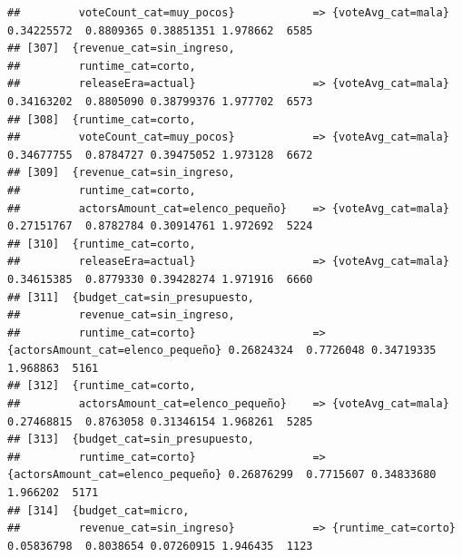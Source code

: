 \documentclass[
]{article}
\begin{document}
\begin{verbatim}
##         voteCount_cat=muy_pocos}            => {voteAvg_cat=mala}                0.34225572  0.8809365 0.38851351 1.978662  6585
## [307]  {revenue_cat=sin_ingreso,                                                                                                
##         runtime_cat=corto,                                                                                                      
##         releaseEra=actual}                  => {voteAvg_cat=mala}                0.34163202  0.8805090 0.38799376 1.977702  6573
## [308]  {runtime_cat=corto,                                                                                                      
##         voteCount_cat=muy_pocos}            => {voteAvg_cat=mala}                0.34677755  0.8784727 0.39475052 1.973128  6672
## [309]  {revenue_cat=sin_ingreso,                                                                                                
##         runtime_cat=corto,                                                                                                      
##         actorsAmount_cat=elenco_pequeño}    => {voteAvg_cat=mala}                0.27151767  0.8782784 0.30914761 1.972692  5224
## [310]  {runtime_cat=corto,                                                                                                      
##         releaseEra=actual}                  => {voteAvg_cat=mala}                0.34615385  0.8779330 0.39428274 1.971916  6660
## [311]  {budget_cat=sin_presupuesto,                                                                                             
##         revenue_cat=sin_ingreso,                                                                                                
##         runtime_cat=corto}                  => {actorsAmount_cat=elenco_pequeño} 0.26824324  0.7726048 0.34719335 1.968863  5161
## [312]  {runtime_cat=corto,                                                                                                      
##         actorsAmount_cat=elenco_pequeño}    => {voteAvg_cat=mala}                0.27468815  0.8763058 0.31346154 1.968261  5285
## [313]  {budget_cat=sin_presupuesto,                                                                                             
##         runtime_cat=corto}                  => {actorsAmount_cat=elenco_pequeño} 0.26876299  0.7715607 0.34833680 1.966202  5171
## [314]  {budget_cat=micro,                                                                                                       
##         revenue_cat=sin_ingreso}            => {runtime_cat=corto}               0.05836798  0.8038654 0.07260915 1.946435  1123

\end{verbatim}
\end{document}
